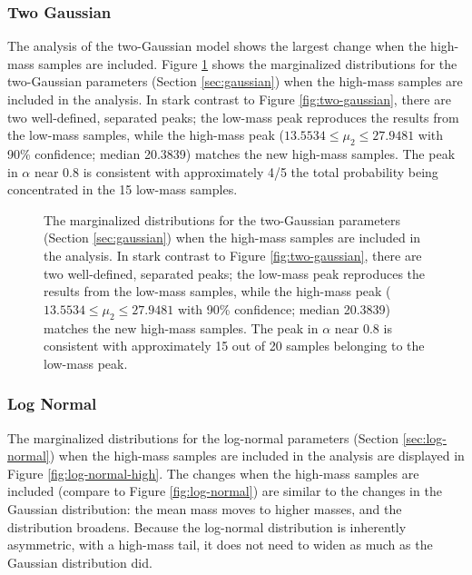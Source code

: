 \documentclass[preprint]{aastex}
\begin{document}
\subsubsection{Two Gaussian}

The analysis of the two-Gaussian model shows the largest change when
the high-mass samples are included.  Figure
\ref{fig:two-gaussian-high} shows the marginalized distributions for
the two-Gaussian parameters (Section \ref{sec:gaussian}) when the
high-mass samples are included in the analysis.  In stark contrast
to Figure \ref{fig:two-gaussian}, there are two well-defined,
separated peaks; the low-mass peak reproduces the results from the
low-mass samples, while the high-mass peak ($13.5534 \leq \mu_2 \leq
27.9481$ with 90\% confidence; median 20.3839) matches the new
high-mass samples.  The peak in $\alpha$ near 0.8 is consistent with
approximately 4/5 the total probability being concentrated in the 15
low-mass samples.

\begin{figure}
  \begin{center}
  \end{center}
  \caption{\label{fig:two-gaussian-high} The marginalized
    distributions for the two-Gaussian parameters (Section
    \ref{sec:gaussian}) when the high-mass samples are included in
    the analysis.  In stark contrast to Figure \ref{fig:two-gaussian},
    there are two well-defined, separated peaks; the low-mass peak
    reproduces the results from the low-mass samples, while the
    high-mass peak ($13.5534 \leq \mu_2 \leq 27.9481$ with 90\%
    confidence; median 20.3839) matches the new high-mass samples.
    The peak in $\alpha$ near 0.8 is consistent with approximately 15
    out of 20 samples belonging to the low-mass peak.}
\end{figure}

\subsubsection{Log Normal}

The marginalized distributions for the log-normal parameters (Section
\ref{sec:log-normal}) when the high-mass samples are included in the
analysis are displayed in Figure \ref{fig:log-normal-high}.  The
changes when the high-mass samples are included (compare to Figure
\ref{fig:log-normal}) are similar to the changes in the Gaussian
distribution: the mean mass moves to higher masses, and the
distribution broadens.  Because the log-normal distribution is
inherently asymmetric, with a high-mass tail, it does not need to
widen as much as the Gaussian distribution did.
\end{document}
